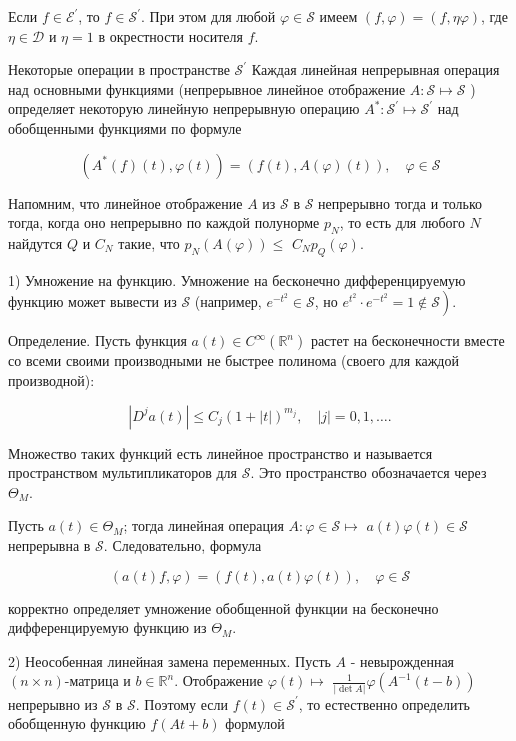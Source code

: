 Если $f \in \mathcal{E}^{\prime}$, то $f \in \mathcal{S}^{\prime}$. При этом для любой $\varphi \in \mathcal{S}$ имеем $(f, \varphi)=(f, \eta \varphi)$, где $\eta \in \mathcal{D}$ и $\eta=1$ в окрестности носителя $f$.

Некоторые операции в пространстве $\mathcal{S}^{\prime}$ Каждая линейная непрерывная операция над основными функциями (непрерывное линейное отображение $A: \mathcal{S} \mapsto \mathcal{S}$ ) определяет некоторую линейную непрерывную операцию $A^*: \mathcal{S}^{\prime} \mapsto \mathcal{S}^{\prime}$ над обобщенными функциями по формуле

$$
\left(A^*(f)(t), \varphi(t)\right)=(f(t), A(\varphi)(t)), \quad \varphi \in \mathcal{S}
$$

Напомним, что линейное отображение $A$ из $\mathcal{S}$ в $\mathcal{S}$ непрерывно тогда и только тогда, когда оно непрерывно по каждой полунорме $p_N$, то есть для любого $N$ найдутся $Q$ и $C_N$ такие, что $p_N(A(\varphi)) \leqslant$ $C_N p_Q(\varphi)$.

1) Умножение на функцию. Умножение на бесконечно дифференцируемую функцию может вывести из $\mathcal{S}$ (например, $e^{-t^2} \in \mathcal{S}$, но $\left.e^{t^2} \cdot e^{-t^2}=1 \notin \mathcal{S}\right)$.

Определение. Пусть функция $a(t) \in C^{\infty}\left(\mathbb{R}^n\right)$ растет на бесконечности вместе со всеми своими производными не быстрее полинома (своего для каждой производной):

$$
\left|D^j a(t)\right| \leqslant C_j(1+|t|)^{m_j}, \quad|j|=0,1, \ldots .
$$


Множество таких функций есть линейное пространство и называется пространством мультипликаторов для $\mathcal{S}$. Это пространство обозначается через $\Theta_M$.

Пусть $a(t) \in \Theta_M$; тогда линейная операция $A: \varphi \in \mathcal{S} \mapsto$ $a(t) \varphi(t) \in \mathcal{S}$ непрерывна в $\mathcal{S}$. Следовательно, формула

$$
(a(t) f, \varphi)=(f(t), a(t) \varphi(t)), \quad \varphi \in \mathcal{S}
$$


корректно определяет умножение обобщенной функции на бесконечно дифференцируемую функцию из $\Theta_M$.

2) Неособенная линейная замена переменных. Пусть $A$ - невырожденная $(n \times n)$-матрица и $b \in \mathbb{R}^n$. Отображение $\varphi(t) \mapsto$ $\frac{1}{|\operatorname{det} A|} \varphi\left(A^{-1}(t-b)\right)$ непрерывно из $\mathcal{S}$ в $\mathcal{S}$. Поэтому если $f(t) \in \mathcal{S}^{\prime}$, то естественно определить обобщенную функцию $f(A t+b)$ формулой

